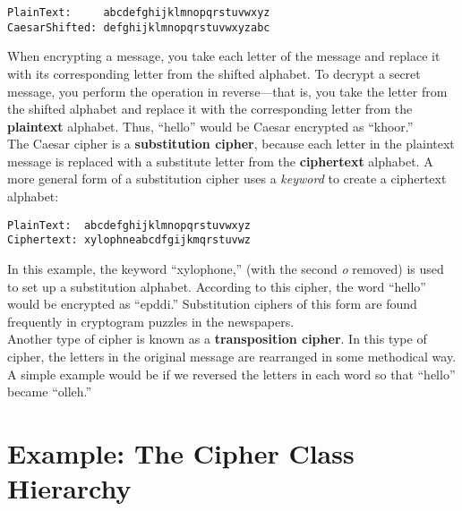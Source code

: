 \begin{jjjlisting}
\begin{lstlisting}
PlainText:     abcdefghijklmnopqrstuvwxyz
CaesarShifted: defghijklmnopqrstuvwxyzabc
\end{lstlisting}
\end{jjjlisting}

\noindent When encrypting a message, you take each letter
of the message and replace it with its corresponding letter from the
shifted alphabet.  To decrypt a secret message, you perform the
operation in reverse---that is, you take the letter from the shifted
alphabet and replace it with the corresponding letter from the
{\bf plaintext} alphabet.  Thus, ``hello'' would be
Caesar encrypted as ``khoor.''\\
\hspace*{1pc}The Caesar cipher is a {\bf substitution cipher},
because each letter in the plaintext message is replaced with
a substitute letter from the {\bf ciphertext}
alphabet. A more general form of a
substitution cipher uses a {\it keyword} to
create a ciphertext alphabet:

\begin{jjjlisting}
\begin{lstlisting}
PlainText:  abcdefghijklmnopqrstuvwxyz
Ciphertext: xylophneabcdfgijkmqrstuvwz
\end{lstlisting}
\end{jjjlisting}

\noindent In this example, the keyword ``xylophone,''
(with the second {\it o} removed) is used to set up a substitution
alphabet.  According to this cipher, the word ``hello'' would be encrypted
as ``epddi.''  Substitution ciphers of this form are found frequently in
cryptogram puzzles in the newspapers.\\
\hspace*{1pc}Another type of cipher is known as a {\bf transposition
cipher}. In this type of cipher, the
letters in the original message are rearranged in some methodical way.
A simple example would be if we reversed the letters in each word so
that ``hello'' became ``olleh.'' 

\section{Example: The Cipher Class Hierarchy}

